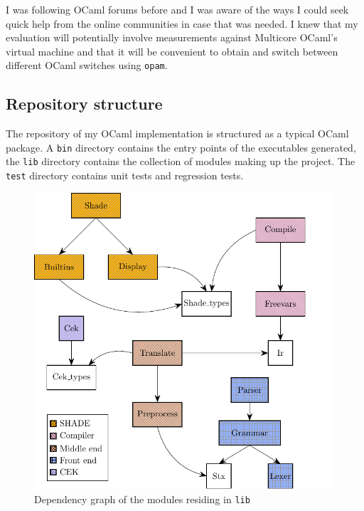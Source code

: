 \documentclass[class=article, crop=false]{standalone}
\begin{document}
I was following OCaml forums before and I was aware of the ways I could seek
quick help from the online communities in case that was needed.
I knew that my evaluation will potentially involve measurements against
Multicore OCaml's virtual machine and that it will be convenient to obtain and
switch between different OCaml switches using \lstinline|opam|.

\subsection{Repository structure}

The repository of my OCaml implementation is structured as a typical OCaml
package. A \verb|bin| directory contains the entry points of the executables
generated, the \verb|lib| directory contains the collection of modules making
up the project. The \verb|test| directory contains unit tests and regression
tests.

\begin{figure}
    \centering
    \includegraphics[width=30em]{../figures/dependency-graph.pdf}
    \caption{Dependency graph of the modules residing in \texttt{lib}}
    \label{fig:dependencies}
\end{figure}
\end{document}
